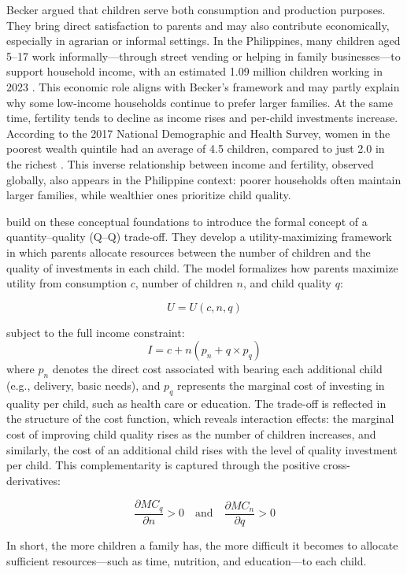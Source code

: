 \documentclass[]{AEA}
\begin{document}
Becker argued that children serve both consumption and production
purposes. They bring direct satisfaction to parents and may also
contribute economically, especially in agrarian or informal settings. In
the Philippines, many children aged 5--17 work informally---through
street vending or helping in family businesses---to support household
income, with an estimated 1.09 million children working in 2023
\citep{manilabulletin2024}. This economic role aligns with Becker's
framework and may partly explain why some low-income households continue
to prefer larger families. At the same time, fertility tends to decline
as income rises and per-child investments increase. According to the
2017 National Demographic and Health Survey, women in the poorest wealth
quintile had an average of 4.5 children, compared to just 2.0 in the
richest \citep{psa2018}. This inverse relationship between income and
fertility, observed globally, also appears in the Philippine context:
poorer households often maintain larger families, while wealthier ones
prioritize child quality.

\citet{beckerlewis1973} build on these conceptual foundations to
introduce the formal concept of a quantity--quality (Q--Q) trade-off.
They develop a utility-maximizing framework in which parents allocate
resources between the number of children and the quality of investments
in each child. The model formalizes how parents maximize utility from
consumption \(c\), number of children \(n\), and child quality \(q\):

\[
U = U(c, n, q)
\]

subject to the full income constraint: \[ I = c+n(p_n + q \times p_q) \]
where \(p_n\) denotes the direct cost associated with bearing each
additional child (e.g., delivery, basic needs), and \(p_q\) represents
the marginal cost of investing in quality per child, such as health care
or education. The trade-off is reflected in the structure of the cost
function, which reveals interaction effects: the marginal cost of
improving child quality rises as the number of children increases, and
similarly, the cost of an additional child rises with the level of
quality investment per child. This complementarity is captured through
the positive cross-derivatives:

\[
\frac{\partial MC_q}{\partial n} > 0 \quad \text{and} \quad \frac{\partial MC_n}{\partial q} > 0
\]

In short, the more children a family has, the more difficult it becomes
to allocate sufficient resources---such as time, nutrition, and
education---to each child.
\end{document}

